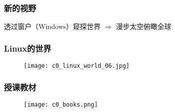 \begin{frame}
  \frametitle{新的视野}
  \begin{center}
    透过窗户（Windows）窥探世界 $\Longrightarrow$ 漫步太空俯瞰全球
  \end{center}
  \vspace{-1em}
  \begin{figure}
    \centering
    \quad
  \end{figure}
\end{frame}

\begin{frame}
  \frametitle{Linux的世界}
  \begin{figure}
    \centering
    \texttt{[image: c0\_linux\_world\_06.jpg]}
  \end{figure}
\end{frame}

\begin{frame}
  \frametitle{授课教材}
  \begin{figure}
    \centering
    \texttt{[image: c0\_books.png]}
  \end{figure}
\end{frame}

